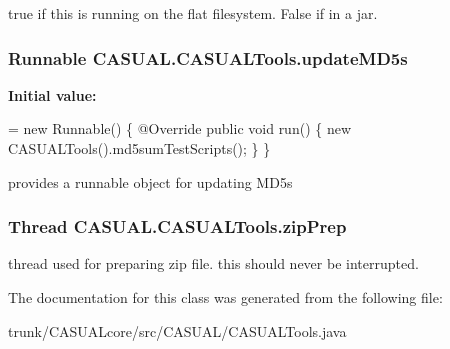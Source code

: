 true if this is running on the flat filesystem. False if in a jar. \hypertarget{class_c_a_s_u_a_l_1_1_c_a_s_u_a_l_tools_a088dc8e9b33d91de1410b126c007cc70}{
\subsubsection[{update\-M\-D5s}]{\setlength{\rightskip}{0pt plus 5cm}Runnable C\-A\-S\-U\-A\-L.\-C\-A\-S\-U\-A\-L\-Tools.\-update\-M\-D5s\hspace{0.3cm}{\ttfamily [static]}}}\label{class_c_a_s_u_a_l_1_1_c_a_s_u_a_l_tools_a088dc8e9b33d91de1410b126c007cc70}
{\bfseries Initial value\-:}
\begin{DoxyCode}
= \textcolor{keyword}{new} Runnable() \{
        @Override
        \textcolor{keyword}{public} \textcolor{keywordtype}{void} run() \{
            \textcolor{keyword}{new} CASUALTools().md5sumTestScripts();
        \}
    \}
\end{DoxyCode}
provides a runnable object for updating M\-D5s \hypertarget{class_c_a_s_u_a_l_1_1_c_a_s_u_a_l_tools_acc2a43a69c74b1f73df4ce08f2bad7bf}{
\subsubsection[{zip\-Prep}]{\setlength{\rightskip}{0pt plus 5cm}Thread C\-A\-S\-U\-A\-L.\-C\-A\-S\-U\-A\-L\-Tools.\-zip\-Prep\hspace{0.3cm}{\ttfamily [static]}}}\label{class_c_a_s_u_a_l_1_1_c_a_s_u_a_l_tools_acc2a43a69c74b1f73df4ce08f2bad7bf}
thread used for preparing zip file. this should never be interrupted. 

The documentation for this class was generated from the following file\-:\begin{DoxyCompactItemize}
\item 
trunk/\-C\-A\-S\-U\-A\-Lcore/src/\-C\-A\-S\-U\-A\-L/C\-A\-S\-U\-A\-L\-Tools.\-java\end{DoxyCompactItemize}
